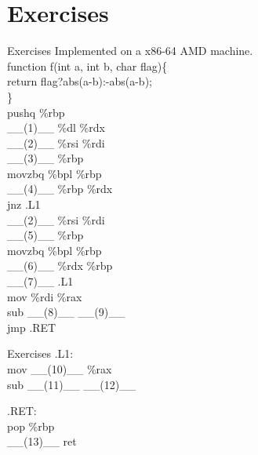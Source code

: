 \documentclass{beamer}
\begin{document}
    \section{Exercises}
        \begin{frame}{Exercises}
            Implemented on a x86-64 AMD machine.\\
            function f(int a, int b, char flag)\{\\
                return flag?abs(a-b):-abs(a-b);\\
            \}\\
            pushq \%rbp\\
            \_\_(1)\_\_ \%dl \%rdx\\
            \_\_(2)\_\_ \%rsi \%rdi\\
                \_\_(3)\_\_ \%rbp\\
            movzbq \%bpl \%rbp\\
                \_\_(4)\_\_ \%rbp \%rdx\\
            jnz .L1\\
            \_\_(2)\_\_ \%rsi \%rdi\\
            \_\_(5)\_\_ \%rbp\\
            movzbq \%bpl \%rbp\\
            \_\_(6)\_\_ \%rdx \%rbp\\
            \_\_(7)\_\_ .L1\\

            mov \%rdi \%rax\\
            sub \_\_(8)\_\_  \_\_(9)\_\_\\
            jmp .RET\\
        \end{frame}
        \begin{frame}{Exercises}
            .L1:\\
                mov \_\_(10)\_\_ \%rax\\
                sub \_\_(11)\_\_ \_\_(12)\_\_

            .RET:\\
                pop \%rbp\\
                \_\_(13)\_\_ ret
        \end{frame}
\end{document}
